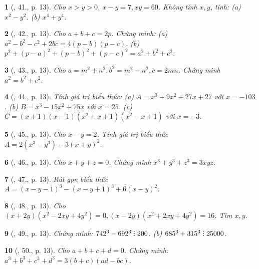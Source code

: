 \documentclass{article}
\newtheorem{baitoan}{}
\DeclareRobustCommand{\divby}{%
	\mathrel{\vbox{\baselineskip.65ex\lineskiplimit0pt\hbox{.}\hbox{.}\hbox{.}}}%
}
\begin{document}
\begin{baitoan}[\cite{Tuyen_Toan_8}, 41., p. 13]
	Cho $x > y > 0$, $x - y = 7,xy = 60$. Không tính $x,y$, tính: (a) $x^2 - y^2$. (b) $x^4 + y^4$.
\end{baitoan}

\begin{baitoan}[\cite{Tuyen_Toan_8}, 42., p. 13]
	Cho $a + b + c = 2p$. Chứng minh: (a) $a^2 - b^2 - c^2 + 2bc = 4(p - b)(p - c)$. (b) $p^2 + (p - a)^2 + (p - b)^2 + (p - c)^2 = a^2 + b^2 + c^2$.
\end{baitoan}

\begin{baitoan}[\cite{Tuyen_Toan_8}, 43., p. 13]
	Cho $a = m^2 + n^2,b^2 = m^2 - n^2,c = 2mn$. Chứng minh $a^2 = b^2 + c^2$.
\end{baitoan}

\begin{baitoan}[\cite{Tuyen_Toan_8}, 44., p. 13]
	Tính giá trị biểu thức: (a) $A = x^3 + 9x^2 + 27x + 27$ với $x = -103$. (b) $B = x^3 - 15x^2 + 75x$ với $x = 25$. (c) $C = (x + 1)(x - 1)(x^2 + x + 1)(x^2 - x + 1)$ với $x = -3$.
\end{baitoan}

\begin{baitoan}[\cite{Tuyen_Toan_8}, 45., p. 13]
	Cho $x - y = 2$. Tính giá trị biểu thức $A = 2(x^3 - y^3) - 3(x + y)^2$.
\end{baitoan}

\begin{baitoan}[\cite{Tuyen_Toan_8}, 46., p. 13]
	Cho $x + y + z = 0$. Chứng minh $x^3 + y^3 + z^3 = 3xyz$.
\end{baitoan}

\begin{baitoan}[\cite{Tuyen_Toan_8}, 47., p. 13]
	Rút gọn biểu thức $A = (x - y - 1)^3 - (x - y + 1)^3 + 6(x - y)^2$.
\end{baitoan}

\begin{baitoan}[\cite{Tuyen_Toan_8}, 48., p. 13]
	Cho $(x + 2y)(x^2 - 2xy + 4y^2) = 0,(x - 2y)(x^2 + 2xy + 4y^2) = 16$. Tìm $x,y$.
\end{baitoan}

\begin{baitoan}[\cite{Tuyen_Toan_8}, 49., p. 13]
	Chứng minh: $742^3 - 692^3\divby200$. (b) $685^3 + 315^3\divby25000$.
\end{baitoan}

\begin{baitoan}[\cite{Tuyen_Toan_8}, 50., p. 13]
	Cho $a + b + c + d = 0$. Chứng minh: $a^3 + b^3 + c^3 + d^3 = 3(b + c)(ad - bc)$.
\end{baitoan}
\end{document}
